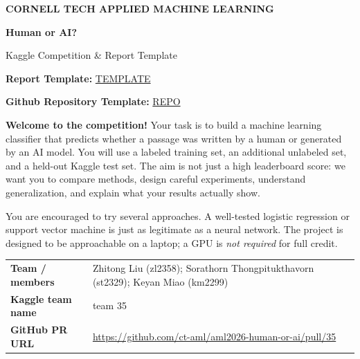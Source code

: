 \documentclass[11pt,letterpaper]{article}
\begin{document}
\thispagestyle{empty}
\vspace*{0.2in}
{\color{teal}\bfseries CORNELL TECH \textbar{} APPLIED MACHINE LEARNING}\par
\vspace{0.15in}
{\Huge\bfseries\color{navy} Human or AI?}\par
\vspace{0.07in}
{\LARGE\color{navy} Kaggle Competition \&  Report Template}\par
\vspace{0.17in}

\textbf{Report Template: }\href{https://www.overleaf.com/project/6ae1fc85355dcf680137d898/share#f2777b20d3adeeecfac9096f78008e2f8daa0ff4be43de3b}{TEMPLATE}

\textbf{Github Repository Template: }\href{https://github.com/sekhari/human-or-ai-submissions}{REPO}

\textbf{Welcome to the competition!} Your task is to build a machine learning classifier that predicts whether a passage was written by a human or generated by an AI model. You will use a labeled training set, an additional unlabeled set, and a held-out Kaggle test set. The aim is not just a high leaderboard score: we want you to compare methods, design careful experiments, understand generalization, and explain what your results actually show.

You are encouraged to try several approaches. A well-tested logistic regression or support vector machine is just as legitimate as a neural network. The project is designed to be approachable on a laptop; a GPU is \emph{not required} for full credit.

\vspace{0.06in}
\begin{tabularx}{\linewidth}{@{}>{\bfseries}p{1.58in}Y@{}}
Team / members & Zhitong Liu (zl2358); Sorathorn Thongpitukthavorn (st2329); Keyan Miao (km2299) \\
Kaggle team name & team 35 \\
GitHub PR URL & \href{https://github.com/ct-aml/aml2026-human-or-ai/pull/35}{https://github.com/ct-aml/aml2026-human-or-ai/pull/35} \\
\end{tabularx}
\vspace{0.06in}
\end{document}
